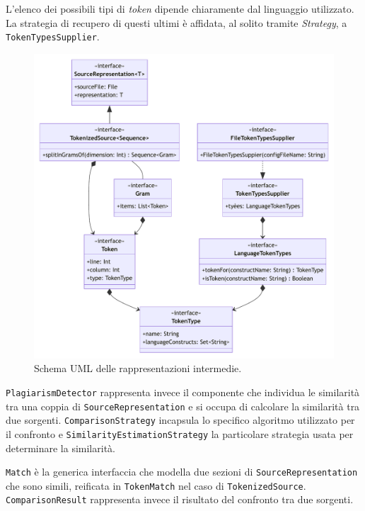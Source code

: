 L'elenco dei possibili tipi di \textit{token} dipende chiaramente dal linguaggio utilizzato.
%
La strategia di recupero di questi ultimi è affidata, al solito tramite \textit{Strategy}, a \texttt{TokenTypesSupplier}.

\begin{figure}[h!]
    \centering
    \includegraphics[width=\textwidth]{resources/img/02-representations.pdf}
    \caption{Schema UML delle rappresentazioni intermedie.}
    \label{img:02-representations}
\end{figure}

\texttt{PlagiarismDetector} rappresenta invece il componente che individua le similarità tra una coppia di \texttt{SourceRepresentation} e si occupa di calcolare la similarità tra due sorgenti.
%
\texttt{ComparisonStrategy} incapsula lo specifico algoritmo utilizzato per il confronto e \texttt{SimilarityEstimationStrategy} la particolare strategia usata per determinare la similarità.

\texttt{Match} è la generica interfaccia che modella due sezioni di \texttt{SourceRepresentation} che sono simili, reificata in \texttt{TokenMatch} nel caso di \texttt{TokenizedSource}.
%
\texttt{ComparisonResult} rappresenta invece il risultato del confronto tra due sorgenti.

